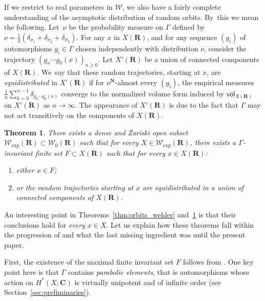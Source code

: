 \documentclass[11pt]{article}
\newenvironment{enumeratea}
{\bgroup\def\theenumi{\alph{enumi}}\begin{enumerate}}
{\end{enumerate}\egroup}
\newcommand{\unsur}[1]{\frac{1}{#1}}
\def\C{\mathbf{C}}
\def\R{\mathbf{R}}
\def\N{\mathbf{N}}
\newcommand{\cW}{\mathcal{W}}
\newcommand{\vol}{{\mathsf{vol}}}
\theoremstyle{plain}
\newtheorem{thm}{Theorem}[section]
\theoremstyle{definition}
\numberwithin{equation}{section}
\begin{document}
If we restrict to real parameters in $ \cW$, we
also have a fairly complete understanding
of the asymptotic distribution of random orbits. By~this we mean the following.
Let~$\nu$ be the probability measure on $\Gamma$ defined by
$\nu = \frac{1}{3}(\delta_{\sigma_1}+ \delta_{\sigma_2}+\delta_{\sigma_3})$. For any $x$ in $X(\R)$, and for any sequence $(g_i)$ of
automorphisms $g_i\in \Gamma$ chosen independently with distribution $\nu$, consider the trajectory $(g_n\cdots g_0(x))_{n\geq 0}$.
Let $X'(\R)$ be a union of connected components of $X(\R)$. We~say that these random trajectories, starting at $x$, are \emph{equidistributed} in $X'(\R)$ if for $\nu^\N$-almost every $(g_i)$, the empirical measures
$\unsur{n} \sum_{k=0}^{n-1} \delta_{g_k\cdots g_0(x)}$ converge
to the normalized volume form induced by $\vol_{X(\R)}$ on $X'(\R)$ as $n\to\infty$. The appearance of $X'(\R)$ is due to the fact that $\Gamma$ may not act transitively on the
components of $X(\R)$.

\begin{thm}\label{thm:equidistribution_wehler}
There exists a dense
and Zariski open subset $ \cW_{\mathrm{exp}}(\R)\subset \cW_0(\R)$
such that for {every} $X\in \cW_{\mathrm{exp}}(\R)$, there exists
a $\Gamma$-invariant finite set $F\subset X(\R)$ such that for {every} $x\in X(\R)$:
\begin{enumeratea}
\item\label{thm:equidistribution_wehlera} either $x\in F$;
\item\label{thm:equidistribution_wehlerb} or the random trajectories starting at $x$ are equidistributed in a union of connected components of $X(\R)$.
\end{enumeratea}
\end{thm}

An interesting point in Theorems~\ref{thm:orbits_wehler} and~\ref{thm:equidistribution_wehler} is that their
conclusions hold for \emph{every} $x\in X$. Let us explain how these theorems fall within
the progression of \cite{stiffness, finite_orbits, invariant} and what the last missing ingredient was until the present paper.

First, the existence of the maximal finite invariant set $F$ follows from \cite[Th.\,C]{finite_orbits}. One key point here is that $\Gamma$ contains \emph{parabolic elements}, that is automorphisms whose
action on $H^*(X;\C)$ is virtually unipotent and
of infinite order (see Section~\ref{sec:preliminaries}).
\end{document}
